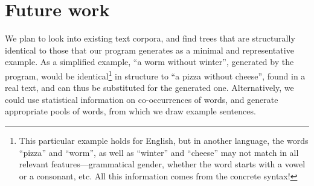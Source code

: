 \section{Future work}

We plan to look into existing text corpora, and find trees that are
structurally identical  to those that our program generates as a
minimal and representative example. As a simplified example, ``a worm
without winter'', generated by the program, would be identical\footnote{This particular example holds for English, but in another language, the words ``pizza'' and ``worm'', as well as ``winter'' and ``cheese'' may not match in all relevant features---grammatical gender, whether the word starts with a vowel or a consonant, etc. All this information comes from the concrete syntax!} 
in structure to ``a pizza without cheese'', found in a real text, and
can thus be substituted for the generated one.   
Alternatively, we could use statistical information on co-occurrences
of words, and generate appropriate pools of words, from which we draw
example sentences. 
